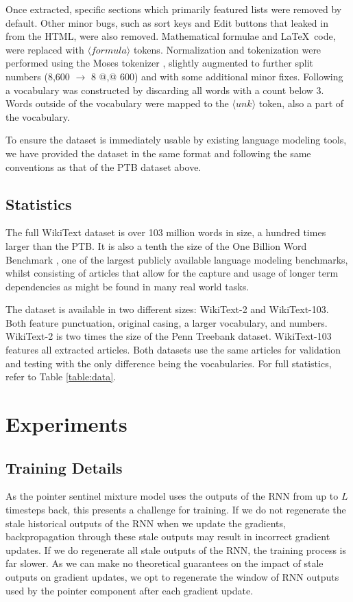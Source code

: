 Once extracted, specific sections which primarily featured lists were removed by default. Other minor bugs, such as sort keys and Edit buttons that leaked in from the HTML, were also removed. Mathematical formulae and \LaTeX\ code, were replaced with $\langle formula \rangle$ tokens. Normalization and tokenization were performed using the Moses tokenizer \cite{Koehn2007}, slightly augmented to further split numbers (8,600 $\rightarrow$ 8 @,@ 600) and with some additional minor fixes. Following \citet{Chelba2013} a vocabulary was constructed by discarding all words with a count below 3. Words outside of the vocabulary were mapped to the $\langle unk \rangle$ token, also a part of the vocabulary.

To ensure the dataset is immediately usable by existing language modeling tools, we have provided the dataset in the same format and following the same conventions as that of the PTB dataset above.

\subsection{Statistics}
The full WikiText dataset is over 103 million words in size, a hundred times larger than the PTB. It is also a tenth the size of the One Billion Word Benchmark \cite{Chelba2013}, one of the largest publicly available language modeling benchmarks, whilst consisting of articles that allow for the capture and usage of longer term dependencies as might be found in many real world tasks.

The dataset is available in two different sizes: WikiText-2 and WikiText-103. Both feature punctuation, original casing, a larger vocabulary, and numbers. WikiText-2 is two times the size of the Penn Treebank dataset. WikiText-103 features all extracted articles. Both datasets use the same articles for validation and testing with the only difference being the vocabularies. For full statistics, refer to Table \ref{table:data}.

\section{Experiments}
\subsection{Training Details}

As the pointer sentinel mixture model uses the outputs of the RNN from up to $L$ timesteps back, this presents a challenge for training. If we do not regenerate the stale historical outputs of the RNN when we update the gradients, backpropagation through these stale outputs may result in incorrect gradient updates. If we do regenerate all stale outputs of the RNN, the training process is far slower. As we can make no theoretical guarantees on the impact of stale outputs on gradient updates, we opt to regenerate the window of RNN outputs used by the pointer component after each gradient update.

